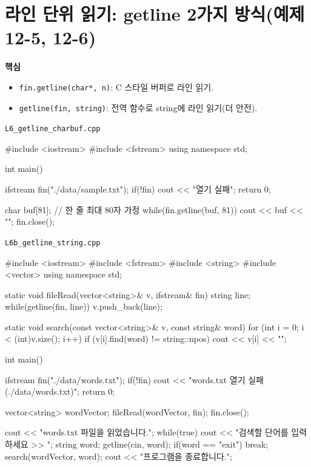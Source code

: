 \documentclass[11pt,a4paper]{article}
\newcommand{\filetag}[1]{\texttt{\color{Accent}#1}}
\begin{document}
\section{라인 단위 읽기: getline 2가지 방식(예제 12-5, 12-6)}
\begin{GoalBox}
\textbf{핵심}
\begin{itemize}[leftmargin=18pt]
  \item \texttt{fin.getline(char*, n)}: C 스타일 버퍼로 라인 읽기. %
  \item \texttt{getline(fin, string)}: 전역 함수로 string에 라인 읽기(더 안전). %
\end{itemize}
\end{GoalBox}

\noindent\filetag{L6\_getline\_charbuf.cpp}
\begin{cppcode}
#include <iostream>
#include <fstream>
using namespace std;

int main() {
    ifstream fin("./data/sample.txt");
    if(!fin) { cout << "열기 실패\n"; return 0; }

    char buf[81]; // 한 줄 최대 80자 가정
    while(fin.getline(buf, 81)) {
        cout << buf << "\n";
    }
    fin.close();
}
\end{cppcode}

\noindent\filetag{L6b\_getline\_string.cpp}
\begin{cppcode}
#include <iostream>
#include <fstream>
#include <string>
#include <vector>
using namespace std;

static void fileRead(vector<string>& v, ifstream& fin) {
    string line;
    while(getline(fin, line)) {
        v.push_back(line);
    }
}

static void search(const vector<string>& v, const string& word) {
    for (int i = 0; i < (int)v.size(); i++) {
        if (v[i].find(word) != string::npos)
            cout << v[i] << "\n";
    }
}

int main() {
    ifstream fin("./data/words.txt");
    if(!fin) { cout << "words.txt 열기 실패(./data/words.txt)\n"; return 0; }

    vector<string> wordVector;
    fileRead(wordVector, fin);
    fin.close();

    cout << "words.txt 파일을 읽었습니다.\n";
    while(true) {
        cout << "검색할 단어를 입력하세요 >> ";
        string word;
        getline(cin, word);
        if(word == "exit") break;
        search(wordVector, word);
    }
    cout << "프로그램을 종료합니다.\n";
}
\end{cppcode}
\end{document}
